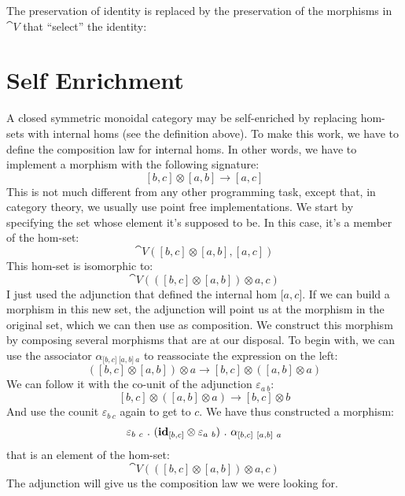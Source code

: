 \begin{figure}[H]
\centering
{}
\end{figure}

\noindent
The preservation of identity is replaced by the preservation of the
morphisms in $\cat{V}$ that ``select'' the identity:

\begin{figure}[H]
\centering
{}
\end{figure}

\section{Self Enrichment}

A closed symmetric monoidal category may be self-enriched by replacing
hom-sets with internal homs (see the definition above). To make this
work, we have to define the composition law for internal homs. In other
words, we have to implement a morphism with the following signature:
\[[b, c] \otimes [a, b] \to [a, c]\]
This is not much different from any other programming task, except that,
in category theory, we usually use point free implementations. We start
by specifying the set whose element it's supposed to be. In this case,
it's a member of the hom-set:
\[\cat{V}([b, c] \otimes [a, b], [a, c])\]
This hom-set is isomorphic to:
\[\cat{V}(([b, c] \otimes [a, b]) \otimes a, c)\]
I just used the adjunction that defined the internal hom
${[}a, c{]}$. If we can build a morphism in this new set, the
adjunction will point us at the morphism in the original set, which we
can then use as composition. We construct this morphism by composing
several morphisms that are at our disposal. To begin with, we can use
the associator $\alpha_{{[}b, c{]}\ {[}a, b{]}\ a}$ to reassociate the
expression on the left:
\[([b, c] \otimes [a, b]) \otimes a \to [b, c] \otimes ([a, b] \otimes a)\]
We can follow it with the co-unit of the adjunction $\varepsilon_{a\ b}$:
\[[b, c] \otimes ([a, b] \otimes a) \to [b, c] \otimes b\]
And use the counit $\varepsilon_{b\ c}$ again to get to $c$. We have
thus constructed a morphism:
\[\varepsilon_{b\ c}\ .\ (\idarrow[{[b, c]}] \otimes \varepsilon_{a\ b})\ .\ \alpha_{[b, c]\ [a, b]\ a}\]
that is an element of the hom-set:
\[\cat{V}(([b, c] \otimes [a, b]) \otimes a, c)\]
The adjunction will give us the composition law we were looking for.


